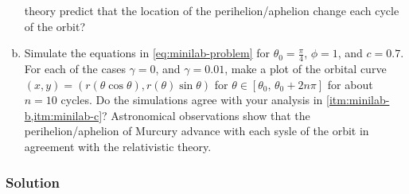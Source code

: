 \documentclass[12pt]{article}
\begin{document}
\begin{enumerate}[(a)]
  theory predict that the location of the perihelion/aphelion change each cycle
  of the orbit?
\item Simulate the equations in \cref{eq:minilab-problem} for
  $\theta_0=\frac{\pi}{4}$, $\phi=1$, and $c=0.7$. For each of the cases
  $\gamma=0$, and $\gamma=0.01$, make a plot of the orbital curve
  $(x,y)=(r(\theta\cos\theta),r(\theta)\sin\theta)$ for
  $\theta\in[\theta_0,\,\theta_0+2n\pi]$  for about $n=10$ cycles. Do the
  simulations agree with your analysis in \cref{itm:minilab-b,itm:minilab-c}?
  Astronomical observations show that the perihelion/aphelion of Murcury advance
  with each sysle of the orbit in agreement with the relativistic theory.
\end{enumerate}

\subsubsection*{Solution}
\todo{}
\end{document}
